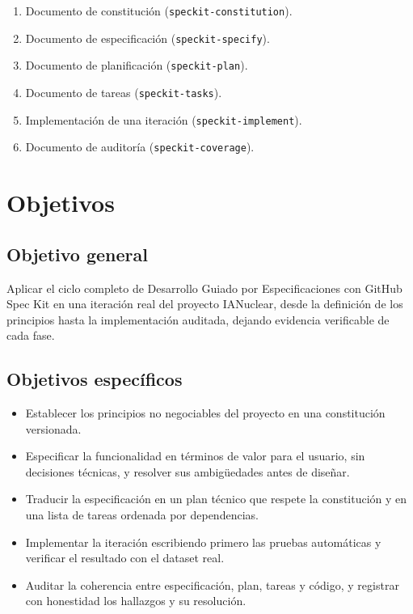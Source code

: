 \documentclass[12pt,a4paper]{article}
\begin{document}
\begin{enumerate}
  \item Documento de constitución (\texttt{speckit-constitution}).
  \item Documento de especificación (\texttt{speckit-specify}).
  \item Documento de planificación (\texttt{speckit-plan}).
  \item Documento de tareas (\texttt{speckit-tasks}).
  \item Implementación de una iteración (\texttt{speckit-implement}).
  \item Documento de auditoría (\texttt{speckit-coverage}).
\end{enumerate}

\section{Objetivos}

\subsection{Objetivo general}
Aplicar el ciclo completo de Desarrollo Guiado por Especificaciones con GitHub Spec Kit en una iteración real del proyecto IANuclear, desde la definición de los principios hasta la implementación auditada, dejando evidencia verificable de cada fase.

\subsection{Objetivos específicos}
\begin{itemize}
  \item Establecer los principios no negociables del proyecto en una constitución versionada.
  \item Especificar la funcionalidad en términos de valor para el usuario, sin decisiones técnicas, y resolver sus ambigüedades antes de diseñar.
  \item Traducir la especificación en un plan técnico que respete la constitución y en una lista de tareas ordenada por dependencias.
  \item Implementar la iteración escribiendo primero las pruebas automáticas y verificar el resultado con el dataset real.
  \item Auditar la coherencia entre especificación, plan, tareas y código, y registrar con honestidad los hallazgos y su resolución.
\end{itemize}
\end{document}
